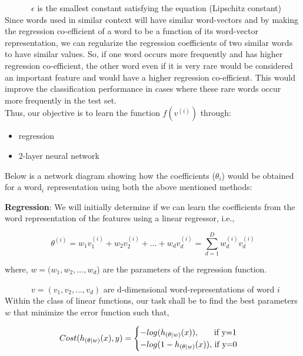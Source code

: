 $\quad\qquad\ \epsilon $ is the smallest constant satisfying the equation (Lipschitz constant)\\

Since words used in similar context will have similar word-vectors and by making the regression co-efficient of a word to be a function of its word-vector representation, we can regularize the regression coefficients of two similar words to have similar values. So, if one word occurs more frequently and has higher regression co-efficient, the other word even if it is very rare would be considered an important feature and would have a higher regression co-efficient. This would improve the classification performance in cases where these rare words occur more frequently in the test set.\\

\noindent Thus, our objective is to learn the function $f(v^{(i)})$ through:

\begin{itemize}
\item regression
\item 2-layer neural network
\end{itemize}

Below is a network diagram showing how the coefficients ($\theta_{i}$) would be obtained for a word$_{i}$ representation using both the above mentioned methods:

\noindent\textbf{Regression}: We will initially determine if we can learn the coefficients from the word representation of the features using a linear regressor, i.e., 

\begin{equation}
\theta^{(i)} = w_{1}v_{1}^{(i)} + w_{2}v_{2}^{(i)} + ... + w_{d}v_{d}^{(i)} = \sum_{d=1}^{D} w_{d}^{(i)}v_{d}^{(i)}
\end{equation}

where, $w = (w_{1}, w_{2}, ..., w_{d}$) are the parameters of the regression function. 

$\quad\qquad\  v= (v_{1}, v_{2}, ..., v_{d})$ are d-dimensional word-representations of word $i$\\

Within the class of linear functions, our task shall be to find the best parameters $w$ that minimize the error function such that,

\begin{equation}\label{cost_fn_eq}
Cost(h_{(\theta| w)}(x), y) = 
\begin{cases}
-log(h_{(\theta| w)}(x)), $\qquad if y=1$
\\
-log(1-h_{(\theta| w)}(x)), $ if y=0$
\end{cases}
\end{equation}\\

